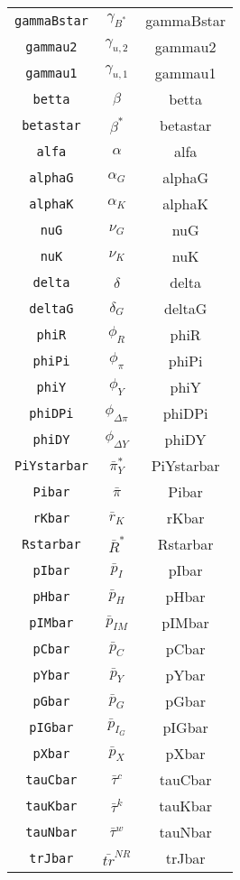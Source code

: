 \begin{center}
\begin{longtable}{ccc}
\texttt{gammaBstar} & $\gamma_{B^*}$ & gammaBstar\\
\texttt{gammau2} & $\gamma_{u,2}$ & gammau2\\
\texttt{gammau1} & $\gamma_{u,1}$ & gammau1\\
\texttt{betta} & $\beta$ & betta\\
\texttt{betastar} & $\beta^*$ & betastar\\
\texttt{alfa} & $\alpha$ & alfa\\
\texttt{alphaG} & $\alpha_G$ & alphaG\\
\texttt{alphaK} & $\alpha_K$ & alphaK\\
\texttt{nuG} & $\nu_G$ & nuG\\
\texttt{nuK} & $\nu_K$ & nuK\\
\texttt{delta} & $\delta$ & delta\\
\texttt{deltaG} & $\delta_G$ & deltaG\\
\texttt{phiR} & $\phi_R$ & phiR\\
\texttt{phiPi} & $\phi_{\pi}$ & phiPi\\
\texttt{phiY} & $\phi_Y$ & phiY\\
\texttt{phiDPi} & $\phi_{\Delta\pi}$ & phiDPi\\
\texttt{phiDY} & $\phi_{\Delta Y}$ & phiDY\\
\texttt{PiYstarbar} & $\bar{\pi}_Y^*$ & PiYstarbar\\
\texttt{Pibar} & $\bar{\pi}$ & Pibar\\
\texttt{rKbar} & $\bar{r}_K$ & rKbar\\
\texttt{Rstarbar} & $\bar{R}^*$ & Rstarbar\\
\texttt{pIbar} & $\bar{p}_I$ & pIbar\\
\texttt{pHbar} & $\bar{p}_H$ & pHbar\\
\texttt{pIMbar} & $\bar{p}_{IM}$ & pIMbar\\
\texttt{pCbar} & $\bar{p}_C$ & pCbar\\
\texttt{pYbar} & $\bar{p}_Y$ & pYbar\\
\texttt{pGbar} & $\bar{p}_G$ & pGbar\\
\texttt{pIGbar} & $\bar{p}_{I_G}$ & pIGbar\\
\texttt{pXbar} & $\bar{p}_X$ & pXbar\\
\texttt{tauCbar} & $\bar{\tau}^c$ & tauCbar\\
\texttt{tauKbar} & $\bar{\tau}^k$ & tauKbar\\
\texttt{tauNbar} & $\bar{\tau}^w$ & tauNbar\\
\texttt{trJbar} & $\bar{tr}^{NR}$ & trJbar\\

\end{longtable}
\end{center}
